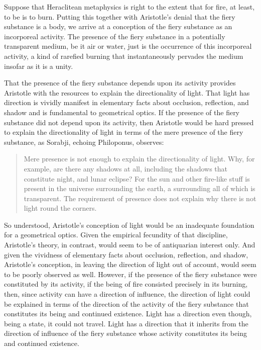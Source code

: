 Suppose that Heraclitean metaphysics is right to the extent that for fire, at least, to be is to burn. Putting this together with Aristotle's denial that the fiery substance is a body, we arrive at a conception of the fiery substance as an incorporeal activity. The presence of the fiery substance in a potentially transparent medium, be it air or water, just is the occurrence of this incorporeal activity, a kind of rarefied burning that instantaneously pervades the medium insofar as it is a unity.

That the presence of the fiery substance depends upon its activity provides Aristotle with the resources to explain the directionality of light. That light has direction is vividly manifest in elementary facts about occlusion, reflection, and shadow and is fundamental to geometrical optics. If the presence of the fiery substance did not depend upon its activity, then Aristotle would be hard pressed to explain the directionality of light in terms of the mere presence of the fiery substance, as Sorabji, echoing Philoponus, observes: 
\begin{quote}
	Mere presence is not enough to explain the directionality of light. Why, for example, are there any shadows at all, including the shadows that constitute night, and lunar eclipse? For the sun and other fire-like stuff is present in the universe surrounding the earth, a surrounding all of which is transparent. The requirement of presence does not explain why there is not light round the corners. \citep[132]{Sorabji:2004fk}
\end{quote}
So understood, Aristotle's conception of light would be an inadequate foundation for a geometrical optics. Given the empirical fecundity of that discipline, Aristotle's theory, in contrast, would seem to be of antiquarian interest only. And given the vividness of elementary facts about occlusion, reflection, and shadow, Aristotle's conception, in leaving the direction of light out of account, would seem to be poorly observed as well. However, if the presence of the fiery substance were constituted by its activity, if the being of fire consisted precisely in its burning, then, since activity can have a direction of influence, the direction of light could be explained in terms of the direction of the activity of the fiery substance that constitutes its being and continued existence. Light has a direction even though, being a state, it could not travel. Light has a direction that it inherits from the direction of influence of the fiery substance whose activity constitutes its being and continued existence.

